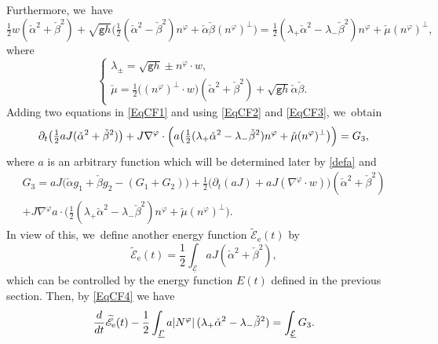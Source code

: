 \documentclass[11pt]{article}
\newcommand{\gr}{{\mathtt g}}
\newcommand{\dt}{\partial_t}
\newcommand{\cE}{{\mathcal E}}
\newcommand{\ul}[1]{\underline{#1}}
\newcommand{\itGamma}{\mathit{\Gamma}}
\theoremstyle{definition}
\begin{document}
Furthermore, we~have
\begin{equation}\label{EqCF3}
\tfrac12w(\check{\alpha}^2+\check{\beta}^2) + \sqrt{\gr h}\bigl(\tfrac12(\check{\alpha}^2-\check{\beta}^2)n^\varphi + \check{\alpha}\check{\beta}(n^\varphi)^\perp\bigr)
= \tfrac12(\lambda_+\check{\alpha}^2-\lambda_-\check{\beta}^2)n^\varphi + \check{\mu}(n^\varphi)^\perp,
\end{equation}
where
\[
\begin{cases}
\lambda_{\pm} = \sqrt{\gr h}\pm n^\varphi\cdot w, \\
\check{\mu} = \tfrac12\bigl((n^\varphi)^\perp\cdot w\bigr)(\check{\alpha}^2+\check{\beta}^2) + \sqrt{\gr h}\check{\alpha}\check{\beta}.
\end{cases}
\]
Adding two equations in \eqref{EqCF1} and using \eqref{EqCF2} and \eqref{EqCF3}, we~obtain
\begin{equation}\label{EqCF4}
\dt \bigl(\tfrac12aJ(\check{\alpha}^2+\check{\beta}^2) \bigr)
+ J\nabla^\varphi\cdot\Bigl(a \bigl(\tfrac12(\lambda_+\check{\alpha}^2-\lambda_-\check{\beta}^2)n^\varphi + \check{\mu}(n^\varphi)^\perp \bigr) \Bigr) = G_3,
\end{equation}
where $a$ is an arbitrary function which will be determined later by \eqref{defa} and
\begin{multline*}
G_3
= aJ \bigl(\check{\alpha}g_1+\check{\beta}g_2-(G_1+G_2) \bigl) + \tfrac12 \bigl(\dt(aJ)+aJ(\nabla^\varphi\cdot w) \bigr)(\check{\alpha}^2+\check{\beta}^2) \\
+ J\nabla^\varphi a \cdot \bigl(\tfrac12(\lambda_+\check{\alpha}^2-\lambda_-\check{\beta}^2)n^\varphi + \check{\mu}(n^\varphi)^\perp \bigr).
\end{multline*}
In view of this, we~define another energy function $\widetilde{\mathscr{E}}_\mathrm{e}(t)$ by
\begin{equation}\label{defEF2}
\widetilde{\mathscr{E}}_\mathrm{e}(t) = \frac12\int_{\ul{\cE}}aJ(\check{\alpha}^2+\check{\beta}^2),
\end{equation}
which can be controlled by the energy function $E(t)$ defined in the previous section.
Then, by \eqref{EqCF4} we have
\begin{equation}\label{EqCF5}
\frac{\rm d}{{\rm d}t}\widetilde{\mathscr{E}}_\mathrm{e}(t) - \frac12\int_{\ul{\itGamma}} a|N^\varphi|\,(\lambda_+\check{\alpha}^2-\lambda_-\check{\beta}^2)
= \int_{\ul{\cE}}G_3.
\end{equation}
\end{document}
